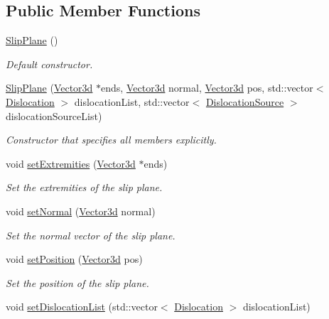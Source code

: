 \subsection*{\-Public \-Member \-Functions}
\begin{DoxyCompactItemize}
\item 
\hyperlink{classSlipPlane_a0d73579f211b7059ee2af1a2816f4eb2}{\-Slip\-Plane} ()
\begin{DoxyCompactList}\small\item\em \-Default constructor. \end{DoxyCompactList}\item 
\hyperlink{classSlipPlane_aa1cfea0af8f0a0179490ff8cae715990}{\-Slip\-Plane} (\hyperlink{classVector3d}{\-Vector3d} $\ast$ends, \hyperlink{classVector3d}{\-Vector3d} normal, \hyperlink{classVector3d}{\-Vector3d} pos, std\-::vector$<$ \hyperlink{classDislocation}{\-Dislocation} $>$ dislocation\-List, std\-::vector$<$ \hyperlink{classDislocationSource}{\-Dislocation\-Source} $>$ dislocation\-Source\-List)
\begin{DoxyCompactList}\small\item\em \-Constructor that specifies all members explicitly. \end{DoxyCompactList}\item 
void \hyperlink{classSlipPlane_aa6b39899a9280d47a3cdef2162dd847c}{set\-Extremities} (\hyperlink{classVector3d}{\-Vector3d} $\ast$ends)
\begin{DoxyCompactList}\small\item\em \-Set the extremities of the slip plane. \end{DoxyCompactList}\item 
void \hyperlink{classSlipPlane_ac0d07f48b5a8515bca8f12cb3eb2d264}{set\-Normal} (\hyperlink{classVector3d}{\-Vector3d} normal)
\begin{DoxyCompactList}\small\item\em \-Set the normal vector of the slip plane. \end{DoxyCompactList}\item 
void \hyperlink{classSlipPlane_a58ead6125387ef790742374f0a507522}{set\-Position} (\hyperlink{classVector3d}{\-Vector3d} pos)
\begin{DoxyCompactList}\small\item\em \-Set the position of the slip plane. \end{DoxyCompactList}\item 
void \hyperlink{classSlipPlane_a3efa3644ca3200d1c84801b3f9eb8ecf}{set\-Dislocation\-List} (std\-::vector$<$ \hyperlink{classDislocation}{\-Dislocation} $>$ dislocation\-List)

\end{DoxyCompactItemize}

